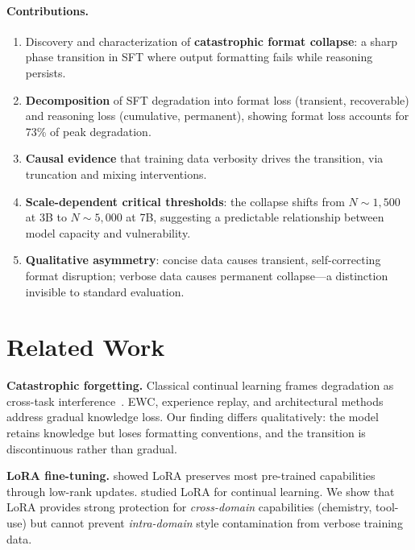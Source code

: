 \documentclass{article}
\begin{document}
\paragraph{Contributions.}
\begin{enumerate}
\item Discovery and characterization of \textbf{catastrophic format collapse}: a sharp phase transition in SFT where output formatting fails while reasoning persists.
\item \textbf{Decomposition} of SFT degradation into format loss (transient, recoverable) and reasoning loss (cumulative, permanent), showing format loss accounts for 73\% of peak degradation.
\item \textbf{Causal evidence} that training data verbosity drives the transition, via truncation and mixing interventions.
\item \textbf{Scale-dependent critical thresholds}: the collapse shifts from $N{\sim}1{,}500$ at 3B to $N{\sim}5{,}000$ at 7B, suggesting a predictable relationship between model capacity and vulnerability.
\item \textbf{Qualitative asymmetry}: concise data causes transient, self-correcting format disruption; verbose data causes permanent collapse---a distinction invisible to standard evaluation.
\end{enumerate}

\section{Related Work}

\textbf{Catastrophic forgetting.} Classical continual learning frames degradation as cross-task interference~\citep{kirkpatrick2017overcoming, luo2023empirical}. EWC, experience replay, and architectural methods address gradual knowledge loss. Our finding differs qualitatively: the model retains knowledge but loses formatting conventions, and the transition is discontinuous rather than gradual.

\textbf{LoRA fine-tuning.} \citet{hu2022lora} showed LoRA preserves most pre-trained capabilities through low-rank updates. \citet{biderman2024lora} studied LoRA for continual learning. We show that LoRA provides strong protection for \emph{cross-domain} capabilities (chemistry, tool-use) but cannot prevent \emph{intra-domain} style contamination from verbose training data.
\end{document}
